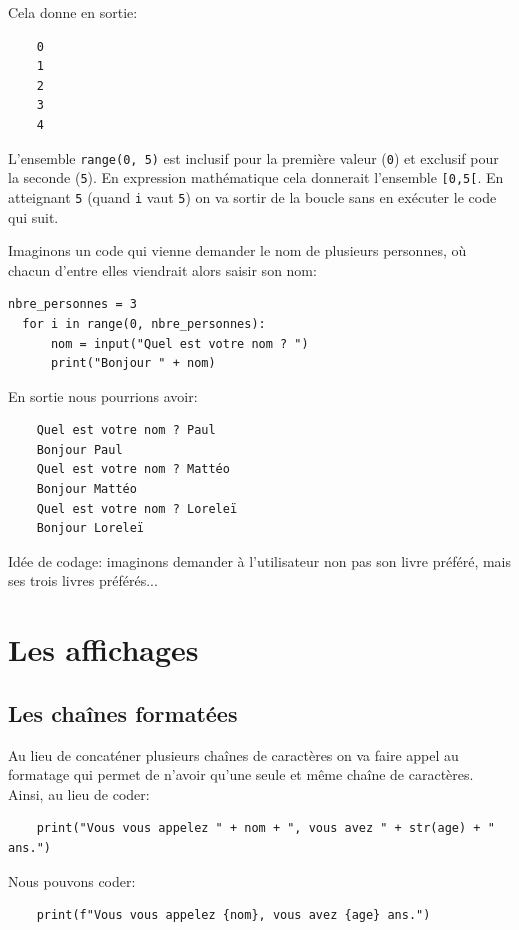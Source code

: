 \documentclass[a4paper,11pt]{book}
\begin{document}
Cela donne en sortie:
\begin{verbatim}
    0
    1
    2
    3
    4
\end{verbatim}
\medskip

L'ensemble \texttt{range(0, 5)} est inclusif pour la première valeur (\texttt{0}) et exclusif pour la seconde (\texttt{5}). En expression mathématique cela donnerait l'ensemble \texttt{[0,5[}. En atteignant \texttt{5} (quand \texttt{i} vaut \texttt{5}) on va sortir de la boucle sans en exécuter le code qui suit.
\medskip

Imaginons un code qui vienne demander le nom de plusieurs personnes, où chacun d'entre elles viendrait alors saisir son nom:
\begin{lstlisting}[caption=Demander trois fois le nom]
  nbre_personnes = 3
  for i in range(0, nbre_personnes):
  	  nom = input("Quel est votre nom ? ")
  	  print("Bonjour " + nom)
\end{lstlisting}
\medskip

En sortie nous pourrions avoir:
\begin{verbatim}
    Quel est votre nom ? Paul
    Bonjour Paul
    Quel est votre nom ? Mattéo
    Bonjour Mattéo
    Quel est votre nom ? Loreleï
    Bonjour Loreleï
\end{verbatim}
\medskip

Idée de codage: imaginons demander à l'utilisateur non pas son livre préféré, mais ses trois livres préférés...
\medskip

\chapter{Les affichages}
\section{Les chaînes formatées}
Au lieu de concaténer plusieurs chaînes de caractères on va faire appel au formatage qui permet de n'avoir qu'une seule et même chaîne de caractères. Ainsi, au lieu de coder:
\begin{verbatim}
    print("Vous vous appelez " + nom + ", vous avez " + str(age) + " ans.")
\end{verbatim}
\medskip

Nous pouvons coder:
\begin{verbatim}
    print(f"Vous vous appelez {nom}, vous avez {age} ans.")
\end{verbatim}
\medskip
\end{document}
